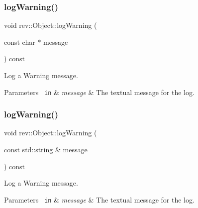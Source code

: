 \subsubsection{\texorpdfstring{logWarning()}{logWarning()}\hspace{0.1cm}{\footnotesize\ttfamily [1/2]}}
{\footnotesize\ttfamily void rev\+::\+Object\+::log\+Warning (\begin{DoxyParamCaption}\item[{const char $\ast$}]{message }\end{DoxyParamCaption}) const\hspace{0.3cm}{\ttfamily [inline]}}



Log a Warning message. 


\begin{DoxyParams}[1]{Parameters}
\mbox{\texttt{ in}}  & {\em message} & The textual message for the log. \\
\hline
\end{DoxyParams}
\mbox{\label{classrev_1_1_object_a7360cf1180eaa4a71dc0d76d77b266a9}} 
\subsubsection{\texorpdfstring{logWarning()}{logWarning()}\hspace{0.1cm}{\footnotesize\ttfamily [2/2]}}
{\footnotesize\ttfamily void rev\+::\+Object\+::log\+Warning (\begin{DoxyParamCaption}\item[{const std\+::string \&}]{message }\end{DoxyParamCaption}) const\hspace{0.3cm}{\ttfamily [inline]}}



Log a Warning message. 


\begin{DoxyParams}[1]{Parameters}
\mbox{\texttt{ in}}  & {\em message} & The textual message for the log. \\
\hline
\end{DoxyParams}
\mbox{\label{classrev_1_1_object_aaeb638d3e10f361c56c211a318a27f3d}} 
